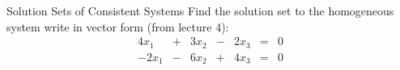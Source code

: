 \documentclass[xcoler=dvipsnames, aspectratio=169]{beamer}
\begin{document}
    \begin{frame}{Solution Sets of Consistent Systems}
        Find the solution set to the homogeneous system write in vector form (from lecture 4):
        \begin{alignat*}{4}
            x_1 &+& 3x_2 &-& 2x_3 &=& 0\\
            -2x_1 &-& 6x_2 &+& 4x_3 &=& 0
        \end{alignat*}
        \iftoggle{showSolutions}{
            \pause
            \[
                \aMat{ccc|c}{
                    1&3&-2&0\\
                    -2&-6&4&0
                }\pause\rightarrow\aMat{ccc|c}{
                    1&3&-2&0\\
                    0&0&0&0
                }
            \]
            \pause
            This gives us:
            $x_1 = -3x_2 + 2x_3$ or as a vector:\pause
            \[
                \vec{x} = \begin{bmatrix}
                    x_1\\x_2\\x_3
                \end{bmatrix} \pause = \begin{bmatrix}
                    -3x_2+2x_3\\
                    x_2\\x_3
                \end{bmatrix} \pause = x_2\begin{bmatrix}
                    -3\\1\\0
                \end{bmatrix} + x_3\begin{bmatrix}
                    2\\0\\1
                \end{bmatrix} \pause = s\begin{bmatrix}
                    -3\\1\\0
                \end{bmatrix} + t\begin{bmatrix}
                    2\\0\\1
                \end{bmatrix}
            \]
        }{
            \vspace{140pt}
        }
    \end{frame}
\end{document}
